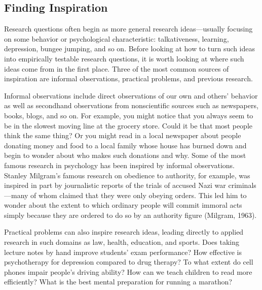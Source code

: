 \documentclass[]{book}
\theoremstyle{definition}
\theoremstyle{definition}
\theoremstyle{remark}
\begin{document}
\subsection{Finding Inspiration}\label{finding-inspiration}

Research questions often begin as more general research ideas---usually
focusing on some behavior or psychological characteristic:
talkativeness, learning, depression, bungee jumping, and so on. Before
looking at how to turn such ideas into empirically testable research
questions, it is worth looking at where such ideas come from in the
first place. Three of the most common sources of inspiration are
informal observations, practical problems, and previous research.

Informal observations include direct observations of our own and others'
behavior as well as secondhand observations from nonscientific sources
such as newspapers, books, blogs, and so on. For example, you might
notice that you always seem to be in the slowest moving line at the
grocery store. Could it be that most people think the same thing? Or you
might read in a local newspaper about people donating money and food to
a local family whose house has burned down and begin to wonder about who
makes such donations and why. Some of the most famous research in
psychology has been inspired by informal observations. Stanley Milgram's
famous research on obedience to authority, for example, was inspired in
part by journalistic reports of the trials of accused Nazi war
criminals---many of whom claimed that they were only obeying orders.
This led him to wonder about the extent to which ordinary people will
commit immoral acts simply because they are ordered to do so by an
authority figure (Milgram, 1963).

Practical problems can also inspire research ideas, leading directly to
applied research in such domains as law, health, education, and sports.
Does taking lecture notes by hand improve students' exam performance?
How effective is psychotherapy for depression compared to drug therapy?
To what extent do cell phones impair people's driving ability? How can
we teach children to read more efficiently? What is the best mental
preparation for running a marathon?
\end{document}
